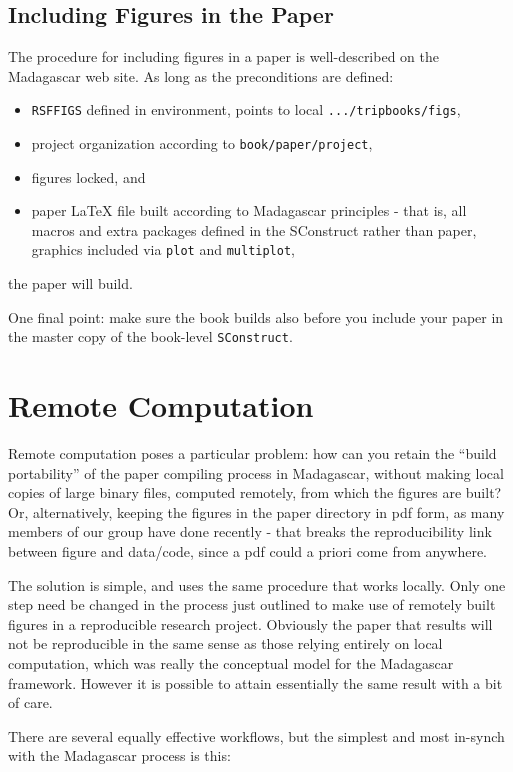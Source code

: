 \subsection{Including Figures in the Paper}
The procedure for including figures in a paper is well-described on the Madagascar web site. As long as the preconditions are defined:
\begin{itemize}
\item {\tt RSFFIGS} defined in environment, points to local {\tt .../tripbooks/figs},
\item project organization according to {\tt book/paper/project},
\item figures locked, and
\item paper LaTeX file built according to Madagascar principles - that is, all macros and extra packages defined in the SConstruct rather than paper, graphics included via {\tt plot} and {\tt multiplot},
\end{itemize}
the paper will build.

One final point: make sure the book builds also before you include your paper in the master copy of the book-level {\tt SConstruct}.

\section{Remote Computation}
Remote computation poses a particular problem: how can you retain the ``build portability'' of the paper compiling process in Madagascar, without making local copies of large binary files, computed remotely, from which the figures are built? Or, alternatively, keeping the figures in the paper directory in pdf form, as many members of our group have done recently - that breaks the reproducibility link between figure and data/code, since a pdf could a priori come from anywhere.
 
The solution is simple, and uses the same procedure that works locally. Only one step need be changed in the process just outlined to make use of remotely built figures in a reproducible research project. Obviously the paper that results will not be reproducible in the same sense as those relying entirely on local computation, which was really the conceptual model for the Madagascar framework. However it is possible to attain essentially the same result with a bit of care.

There are several equally effective workflows, but the simplest and most in-synch with the Madagascar process is this:

